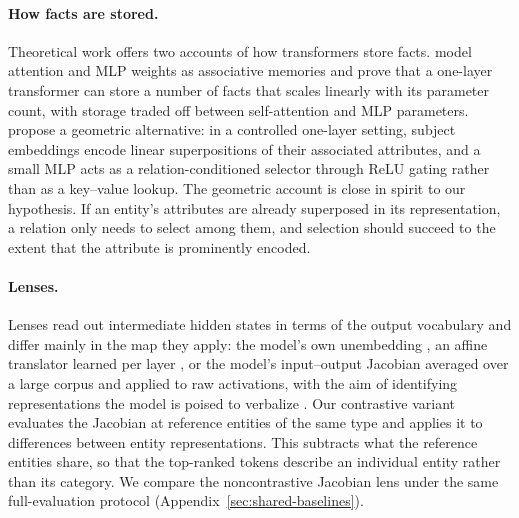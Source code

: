 \paragraph{How facts are stored.} Theoretical work offers two accounts of
how transformers store facts.
\citet{nichani2025understanding} model attention and MLP
weights as associative memories and prove that a one-layer transformer
can store a number of facts that scales linearly with its parameter
count, with storage traded off between self-attention and MLP
parameters. \citet{DBLP:journals/corr/abs-2605-12426} propose a
geometric alternative: in a controlled one-layer setting, subject
embeddings encode linear superpositions of their associated attributes,
and a small MLP acts as a relation-conditioned selector through ReLU
gating rather than as a key--value lookup. The geometric account is
close in spirit to our hypothesis. If an entity's attributes are already
superposed in its representation, a relation only needs to select among
them, and selection should succeed to the extent that the attribute is
prominently encoded.

\paragraph{Lenses.} Lenses read out intermediate hidden states in terms of
the output vocabulary and differ mainly in the map they apply: the
model's own unembedding
\citep{nostalgebraist2020interpreting}, an affine translator
learned per layer \citep{belrose2023eliciting}, or
the model's input--output Jacobian averaged over a large corpus and
applied to raw activations, with the aim of identifying representations
the model is poised to verbalize
\citep{gurnee2026workspace}.
Our contrastive variant evaluates the Jacobian at reference entities of
the same type and applies it to differences between entity
representations. This subtracts what the reference entities share, so
that the top-ranked tokens describe an individual entity rather than its
category. We compare the noncontrastive
Jacobian lens under the same full-evaluation protocol
(Appendix~\ref{sec:shared-baselines}).